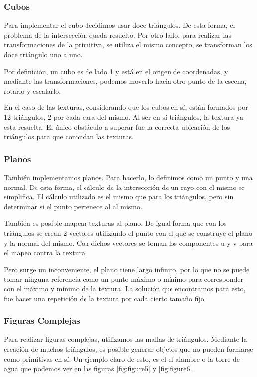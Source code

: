 \documentclass[a4paper,10pt]{article}
\begin{document}
\subsubsection{Cubos}

Para implementar el cubo decidimos usar doce tri\'angulos.  De esta forma, el
problema de la intersecci\'on queda resuelto.  Por otro lado, para realizar las
transformaciones de la primitiva, se utiliza el mismo concepto, se transforman
los doce tri\'angulo uno a uno.

Por definici\'on, un cubo es de lado 1 y est\'a en el origen de coordenadas, y
mediante las transformaciones, podemos moverlo hacia otro punto de la escena, 
rotarlo y escalarlo.

En el caso de las texturas, considerando que los cubos en s\'i, est\'an
formados por 12 tri\'angulos, 2 por cada cara del mismo. Al ser en s\'i
tri\'angulos, la textura ya esta resuelta. El \'unico obst\'aculo a superar fue
la correcta ubicaci\'on de los tri\'angulos para que conicidan las texturas.

\subsubsection{Planos}

Tambi\'en implementamos planos.  Para hacerlo, lo definimos como un punto y una
normal.  De esta forma, el c\'alculo de la intersecci\'on de un rayo con el
mismo se simplifica.  El c\'alculo utilizado es el mismo que para los
tri\'angulos, pero sin determinar si el punto pertenece al al mismo.

Tambi\'en es posible mapear texturas al plano.  De igual forma que con los
tri\'angulos se crean 2 vectores utilizando el punto con el que se construye el
plano y la normal del mismo. Con dichos vectores se toman los componentes u y v
para el mapeo contra la textura.

Pero surge un inconveniente, el plano tiene largo infinito, por lo que no se
puede tomar ninguna referencia como un punto m\'aximo o m\'inimo para
corresponder con el m\'aximo y m\'inimo de la textura. La soluci\'on que
encontramos para esto, fue hacer una repetici\'on de la textura por cada cierto
tama\~no fijo.


\subsubsection{Figuras Complejas}

Para realizar figuras complejas, utilizamos las mallas de tri\'angulos. 
Mediante la creaci\'on de muchos tri\'angulos, es posible generar objetos que
no pueden formarse como primitivas en s\'i.  Un ejemplo claro de esto, es el el
alambre o la torre de agua que podemos ver en las figuras \ref{fig:figure5} y
\ref{fig:figure6}.
\end{document}
